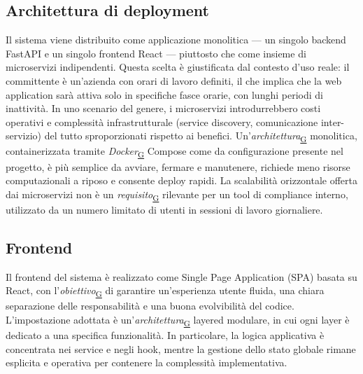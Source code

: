 \documentclass[a4paper,12pt]{article}
\begin{document}
        \subsection{Architettura di deployment}
            Il sistema viene distribuito come applicazione monolitica — un singolo backend FastAPI e un singolo frontend React — piuttosto che come insieme di microservizi indipendenti. Questa scelta è giustificata dal contesto d'uso reale: il committente è un'azienda con orari di lavoro definiti, il che implica che la web application sarà attiva solo in specifiche fasce orarie, con lunghi periodi di inattività. In uno scenario del genere, i microservizi introdurrebbero costi operativi e complessità infrastrutturale (service discovery, comunicazione inter-servizio) del tutto sproporzionati rispetto ai benefici. Un'\textit{architettura}\textsubscript{\href{https://atlasteam9.github.io/Atlas/glossario.html\#Architettura}{G}} monolitica, containerizzata tramite \textit{Docker}\textsubscript{\href{https://atlasteam9.github.io/Atlas/glossario.html\#Docker}{G}} Compose come da configurazione presente nel progetto, è più semplice da avviare, fermare e manutenere, richiede meno risorse computazionali a riposo e consente deploy rapidi. La scalabilità orizzontale offerta dai microservizi non è un \textit{requisito}\textsubscript{\href{https://atlasteam9.github.io/Atlas/glossario.html\#Requisito}{G}} rilevante per un tool di compliance interno, utilizzato da un numero limitato di utenti in sessioni di lavoro giornaliere.

        \subsection{Frontend}
            Il frontend del sistema è realizzato come Single Page Application (SPA) basata su React, con l'\textit{obiettivo}\textsubscript{\href{https://atlasteam9.github.io/Atlas/glossario.html\#Obiettivo}{G}} di garantire un'esperienza utente fluida, una chiara separazione delle responsabilità e una buona evolvibilità del codice.  
            L'impostazione adottata è un'\textit{architettura}\textsubscript{\href{https://atlasteam9.github.io/Atlas/glossario.html\#Architettura}{G}} layered modulare, in cui ogni layer è dedicato a una specifica funzionalità. In particolare, la logica applicativa è concentrata nei service e negli hook, mentre la gestione dello stato globale rimane esplicita e operativa per contenere la complessità implementativa.
            
\end{document}
